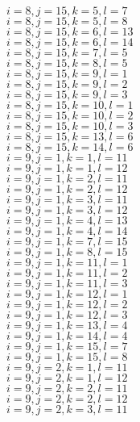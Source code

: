 \documentclass[14pt]{article}
\begin{document}
    $i=8,j=15,k=5,l=7 $ \\ 
    $i=8,j=15,k=5,l=8 $ \\ 
    $i=8,j=15,k=6,l=13 $ \\ 
    $i=8,j=15,k=6,l=14 $ \\ 
    $i=8,j=15,k=7,l=5 $ \\ 
    $i=8,j=15,k=8,l=5 $ \\ 
    $i=8,j=15,k=9,l=1 $ \\ 
    $i=8,j=15,k=9,l=2 $ \\ 
    $i=8,j=15,k=9,l=3 $ \\ 
    $i=8,j=15,k=10,l=1 $ \\ 
    $i=8,j=15,k=10,l=2 $ \\ 
    $i=8,j=15,k=10,l=3 $ \\ 
    $i=8,j=15,k=13,l=6 $ \\ 
    $i=8,j=15,k=14,l=6 $ \\ 
    $i=9,j=1,k=1,l=11 $ \\ 
    $i=9,j=1,k=1,l=12 $ \\ 
    $i=9,j=1,k=2,l=11 $ \\ 
    $i=9,j=1,k=2,l=12 $ \\ 
    $i=9,j=1,k=3,l=11 $ \\ 
    $i=9,j=1,k=3,l=12 $ \\ 
    $i=9,j=1,k=4,l=13 $ \\ 
    $i=9,j=1,k=4,l=14 $ \\ 
    $i=9,j=1,k=7,l=15 $ \\ 
    $i=9,j=1,k=8,l=15 $ \\ 
    $i=9,j=1,k=11,l=1 $ \\ 
    $i=9,j=1,k=11,l=2 $ \\ 
    $i=9,j=1,k=11,l=3 $ \\ 
    $i=9,j=1,k=12,l=1 $ \\ 
    $i=9,j=1,k=12,l=2 $ \\ 
    $i=9,j=1,k=12,l=3 $ \\ 
    $i=9,j=1,k=13,l=4 $ \\ 
    $i=9,j=1,k=14,l=4 $ \\ 
    $i=9,j=1,k=15,l=7 $ \\ 
    $i=9,j=1,k=15,l=8 $ \\ 
    $i=9,j=2,k=1,l=11 $ \\ 
    $i=9,j=2,k=1,l=12 $ \\ 
    $i=9,j=2,k=2,l=11 $ \\ 
    $i=9,j=2,k=2,l=12 $ \\ 
    $i=9,j=2,k=3,l=11 $ \\ 
\end{document}
